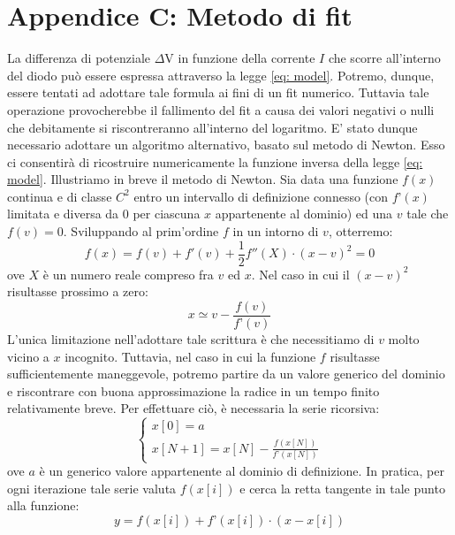 \documentclass{article}[a4paper, oneside, 11pt]
\begin{document}
\section{Appendice C: Metodo di fit}\label{app: C}
La differenza di potenziale $\Delta$V in funzione della corrente $I$ che scorre 
all’interno del diodo può essere espressa attraverso la legge
\eqref{eq: model}. Potremo, dunque, essere tentati ad adottare tale formula
ai fini di un fit numerico. 
Tuttavia tale operazione provocherebbe il fallimento del fit a causa dei valori 
negativi o nulli che debitamente si riscontreranno all’interno del logaritmo. 
E’ stato dunque necessario adottare un algoritmo alternativo, basato sul 
metodo di Newton\cite{tesi}. Esso ci consentirà di ricostruire numericamente 
la funzione inversa della legge \eqref{eq: model}.
Illustriamo in breve il metodo di Newton. Sia data una funzione $f(x)$ continua e di classe $C^{2}$
entro un intervallo di definizione connesso (con $f’(x)$ limitata e 
diversa da $0$ per ciascuna $x$ appartenente al dominio) ed una $v$ tale che
$f(v) = 0$. Sviluppando al prim’ordine $f$ in un intorno di $v$, otterremo:
\begin{equation}
f(x) = f(v) + f{'}(v) + {\frac{1}{2}} {f{''}(X)} \cdot  {( x - v)^2} = 0
\end{equation}
ove $X$ è un numero reale compreso fra $v$ ed $x$. Nel caso in cui il $(x-v)^2 
$risultasse prossimo a zero:
\begin{equation}
x \simeq v   -  {\frac {f(v)}{f’(v)}}
\end{equation}
L’unica limitazione nell'adottare tale scrittura è che necessitiamo di $v$ 
molto vicino a $x$ incognito. Tuttavia, nel caso in cui la funzione $f$ risultasse 
sufficientemente maneggevole, potremo partire da un valore generico del dominio 
e riscontrare con buona approssimazione la radice in un tempo finito 
relativamente breve. Per effettuare ciò, è necessaria la serie ricorsiva:
\begin{equation}
\begin{cases}
x[0] = a \\ x[N+1] = x[N] - \frac {f(x[N])} {f’(x[N])}
\end{cases}
\end{equation}
ove $a$ è un generico valore appartenente al dominio di definizione. In pratica, 
per ogni iterazione tale serie valuta $f(x[i])$ e cerca la retta tangente in tale 
punto alla funzione:
\begin{equation}
y = f(x[i]) + f’(x[i]) \cdot (x-x[i])
\end{equation}
\end{document}
